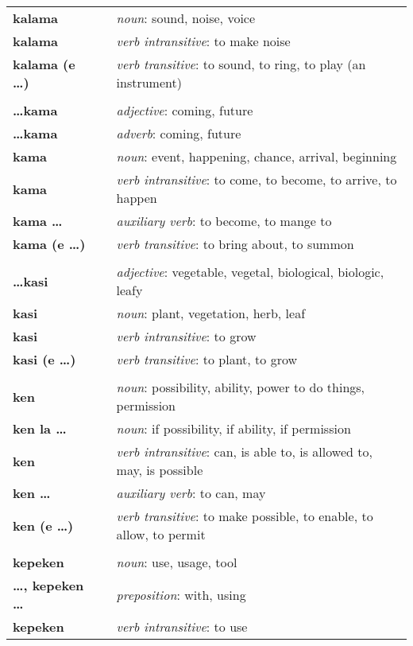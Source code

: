 \begin{supertabular}{p{2,5cm}|ll}
\textbf{kalama} && \textit{noun}: sound, noise, voice \\ 
\textbf{kalama} && \textit{verb intransitive}: to make noise \\ 
\textbf{kalama (e \dots)} && \textit{verb transitive}: to sound, to ring, to play (an instrument) \\ 
 && \\ %
\textbf{\dots kama} && \textit{adjective}: coming, future \\ 
\textbf{\dots kama} && \textit{adverb}: coming, future \\ 
\textbf{kama} && \textit{noun}: event, happening, chance, arrival, beginning \\ 
\textbf{kama} && \textit{verb intransitive}: to come, to become, to arrive, to happen \\ 
\textbf{kama \dots} && \textit{auxiliary verb}: to become, to mange to \\ 
\textbf{kama (e \dots)} && \textit{verb transitive}: to bring about, to summon \\ 
 && \\ %
\textbf{\dots kasi} && \textit{adjective}: vegetable, vegetal, biological, biologic, leafy \\ 
\textbf{kasi} && \textit{noun}: plant, vegetation, herb, leaf \\ 
\textbf{kasi} && \textit{verb intransitive}: to grow \\ 
\textbf{kasi (e \dots)} && \textit{verb transitive}: to plant, to grow \\ 
 && \\ %
\textbf{ken} && \textit{noun}: possibility, ability, power to do things, permission \\ 
\textbf{ken la \dots} && \textit{noun}: if possibility, if ability, if permission \\ 
\textbf{ken} && \textit{verb intransitive}: can, is able to, is allowed to, may, is possible \\ 
\textbf{ken \dots} && \textit{auxiliary verb}: to can, may \\ 
\textbf{ken (e \dots)} && \textit{verb transitive}: to make possible, to enable, to allow, to permit \\ 
 && \\ %
\textbf{kepeken} && \textit{noun}: use, usage, tool \\ 
\textbf{\dots , kepeken \dots} && \textit{preposition}: with, using \\ 
\textbf{kepeken} && \textit{verb intransitive}: to use \\ 

\end{supertabular}
